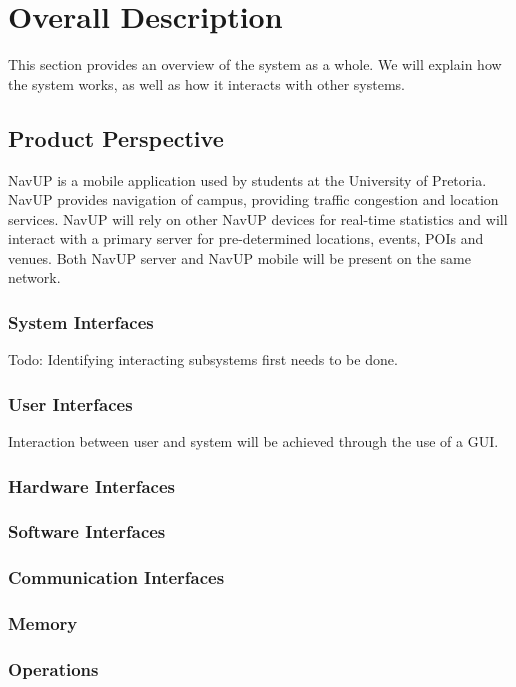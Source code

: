 \documentclass{article}
\begin{document}
\section{Overall Description}

    \begin{flushleft}
        This section provides an overview of the system as a whole. We will explain how the system works, as well as how it interacts with other systems.
    \end{flushleft}
    
    
    \subsection{Product Perspective}
    
        NavUP is a mobile application used by students at the University of Pretoria. NavUP provides navigation of campus, providing traffic congestion and location services. NavUP will rely on other NavUP devices for real-time statistics and will interact with a primary server for pre-determined locations, events, POIs and venues. Both NavUP server and NavUP mobile will be present on the same network.
        \subsubsection{System Interfaces}
        Todo: Identifying interacting subsystems first needs to be done.
        \subsubsection{User Interfaces}
            Interaction between user and system will be achieved through the use of a GUI.        
        \subsubsection{Hardware Interfaces}
        \subsubsection{Software Interfaces}
        \subsubsection{Communication Interfaces}
        \subsubsection{Memory}
        \subsubsection{Operations}
\end{document}
